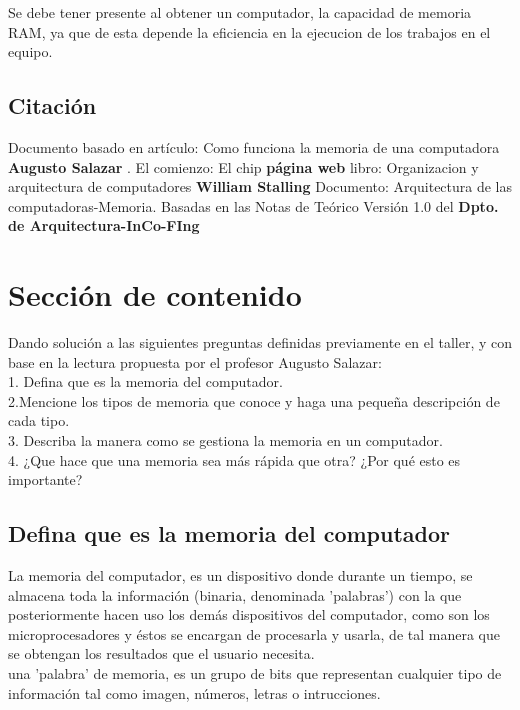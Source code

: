 \documentclass{article}
\begin{document}
Se debe tener presente al obtener un computador, la capacidad de memoria RAM, ya que de esta depende la eficiencia en la ejecucion de los trabajos en el equipo.

\subsection{Citación}
Documento basado en artículo: Como funciona la memoria de una computadora \textbf{Augusto Salazar} \cite{Salazar}.
El comienzo: El chip \textbf{página web}
\cite{website}
libro: Organizacion y arquitectura de computadores \textbf{William Stalling} \cite{Stalling}
Documento: Arquitectura de las computadoras-Memoria. Basadas en las Notas de Teórico Versión 1.0 del \textbf{Dpto. de Arquitectura-InCo-FIng}\cite{document}

\section{Sección de contenido} \label{contenido}
Dando solución a las siguientes preguntas definidas previamente en el taller, y con base en la lectura propuesta por el profesor Augusto Salazar:\\

%
1. Defina que es la memoria del computador.\\
2.Mencione los tipos de memoria que conoce y haga una pequeña descripción de cada tipo.\\
3. Describa la manera como se gestiona la memoria en un computador.\\
4. ¿Que hace que una memoria sea más rápida que otra? ¿Por qué esto es importante?\\


\subsection{Defina que es la memoria del computador}
%
La memoria del computador, es un dispositivo donde durante un tiempo, se almacena toda la información (binaria, denominada 'palabras') con la que posteriormente hacen uso los demás dispositivos del computador, como son los microprocesadores y éstos se encargan de procesarla y usarla, de tal manera que se obtengan los resultados que el usuario necesita.\\

una 'palabra' de memoria, es un grupo de bits que representan cualquier tipo de información tal como imagen, números, letras o intrucciones.
\end{document}
